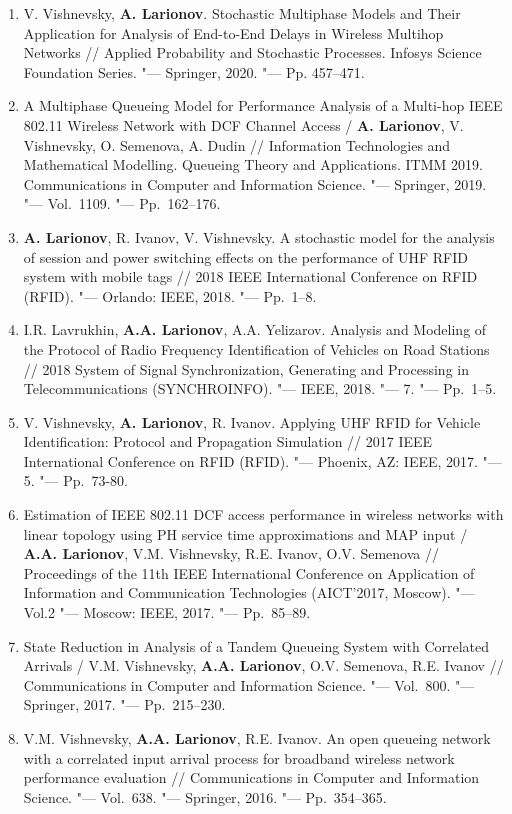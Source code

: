 \begin{frame}
\begin{enumerate}
        \item V. Vishnevsky, \textbf{A. Larionov}. Stochastic Multiphase Models and Their Application for Analysis of End-to-End Delays in Wireless Multihop Networks // Applied Probability and Stochastic Processes. Infosys Science Foundation Series. "--- Springer, 2020. "--- Pp. 457--471.
        \item A Multiphase Queueing Model for Performance Analysis of a Multi-hop IEEE 802.11 Wireless Network with DCF Channel Access / \textbf{A. Larionov}, V. Vishnevsky, O. Semenova, A. Dudin // Information Technologies and Mathematical Modelling. Queueing Theory and Applications. ITMM 2019. Communications in Computer and Information Science. "--- Springer, 2019. "--- Vol.~1109. "--- Pp.~162--176.
        \item \textbf{A. Larionov}, R. Ivanov, V. Vishnevsky. A stochastic model for the analysis of session and power switching effects on the performance of UHF RFID system with mobile tags // 2018 IEEE International Conference on RFID (RFID). "--- Orlando: IEEE, 2018. "--- Pp.~1--8.
        \item I.R. Lavrukhin, \textbf{A.A. Larionov}, A.A. Yelizarov. Analysis and Modeling of the Protocol of Radio Frequency Identification of Vehicles on Road Stations // 2018 System of Signal Synchronization, Generating and Processing in Telecommunications (SYNCHROINFO). "--- IEEE, 2018. "--- 7. "--- Pp.~1--5.
        \item V. Vishnevsky, \textbf{A. Larionov}, R. Ivanov. Applying UHF RFID for Vehicle Identification: Protocol and Propagation Simulation // 2017 IEEE International Conference on RFID (RFID). "--- Phoenix, AZ: IEEE, 2017. "--- 5. "--- Pp.~73-80.
        \item Estimation of IEEE 802.11 DCF access performance in wireless networks with linear topology using PH service time approximations and MAP input / \textbf{A.A. Larionov}, V.M. Vishnevsky, R.E. Ivanov, O.V. Semenova // Proceedings of the 11th IEEE International Conference on Application of Information and Communication Technologies (AICT'2017, Moscow). "--- Vol.2 "--- Moscow: IEEE, 2017. "--- Pp.~85--89.
        \item State Reduction in Analysis of a Tandem Queueing System with Correlated Arrivals / V.M. Vishnevsky, \textbf{A.A. Larionov}, O.V. Semenova, R.E. Ivanov // Communications in Computer and Information Science. "--- Vol.~800. "--- Springer, 2017. "--- Pp.~215--230.
        \item V.M. Vishnevsky, \textbf{A.A. Larionov}, R.E. Ivanov. An open queueing network with a correlated input arrival process for broadband wireless network performance evaluation // Communications in Computer and Information Science. "--- Vol.~638. "--- Springer, 2016. "--- Pp.~354--365.

\end{enumerate}
\end{frame}
